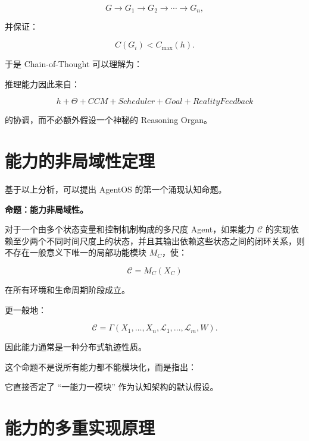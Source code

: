 \[
G
\rightarrow
G_1
\rightarrow
G_2
\rightarrow
\cdots
\rightarrow
G_n,
\]

并保证：

\[
C(G_i)
<
C_{\max}(h).
\]

于是 Chain-of-Thought 可以理解为：

\begin{statementbox}
\centering
{}
\end{statementbox}

推理能力因此来自：

\[
h
+
\Theta
+
CCM
+
Scheduler
+
Goal
+
RealityFeedback
\]

的协调，而不必额外假设一个神秘的 Reasoning Organ。

\section{能力的非局域性定理}

基于以上分析，可以提出 AgentOS 的第一个涌现认知命题。

\textbf{命题：能力非局域性。}

对于一个由多个状态变量和控制机制构成的多尺度 Agent，如果能力 $\mathcal C$ 的实现依赖至少两个不同时间尺度上的状态，并且其输出依赖这些状态之间的闭环关系，则不存在一般意义下唯一的局部功能模块 $M_C$，使：

\[
\mathcal C
=
M_C(X_C)
\]

在所有环境和生命周期阶段成立。

更一般地：

\[
\boxed{
\mathcal C
=
\Gamma(
X_1,\ldots,X_n,
\mathcal L_1,\ldots,\mathcal L_m,
W
).
}
\]

因此能力通常是一种分布式轨迹性质。

这个命题不是说所有能力都不能模块化，而是指出：

\begin{statementbox}
\centering
{}
\end{statementbox}

它直接否定了 ``一能力一模块'' 作为认知架构的默认假设。

\section{能力的多重实现原理}

